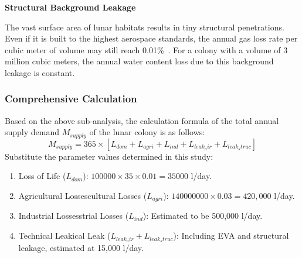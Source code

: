 \noindent\textbf{Structural Background Leakage}\par
The vast surface area of ​​lunar habitats results in tiny structural penetrations.
Even if it is built to the highest aerospace standards, the annual gas loss rate per cubic meter of volume may still reach 0.01\%~\cite{abney_sabatier_h2}.
For a colony with a volume of 3 million cubic meters, the annual water content loss due to this background leakage is constant.

\subsubsection{Comprehensive Calculation}
Based on the above sub-analysis, the calculation formula of the total annual supply demand $M_{supply}$ of the lunar colony is as follows:
\[M_{supply}=365\times[L_{dom}+L_{agri}+L_{ind}+L_{leak_air}+L_{leak_struc}]\]
Substitute the parameter values ​​determined in this study:
\begin{enumerate}
\item Loss of Life ($L_{dom}$): $100000×35×0.01=35000$ l/day.
\item Agricultural Lossescultural Losses ($L_{agri}$): $140000000 \times 0.03 = 420,000$ l/day.
\item Industrial Lossesstrial Losses ($L_{ind}$): Estimated to be 500,000 l/day.
\item Technical Leakical Leak ($L_{leak_air}+L_{leak_struc}$): Including EVA and structural leakage, estimated at 15,000 l/day.
\end{enumerate}
\begin{table}[htbp]
\centering
\caption{Annual Water Mass Balance Summary (100,000-Person Scale)}
\label{tab:annual_water_balance}

\end{table}
\FloatBarrier

